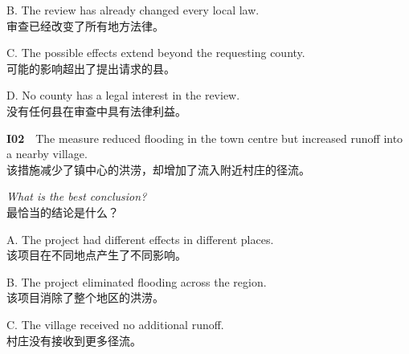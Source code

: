 \documentclass[a4paper,11pt,openany]{report}
\newcommand{\zhline}[1]{{\CJKsf\color{bodygrey}#1}}
\begin{document}
\begin{samepage}
B. The review has already changed every local law.\\
\zhline{审查已经改变了所有地方法律。}
\par\end{samepage}

\begin{samepage}
C. The possible effects extend beyond the requesting county.\\
\zhline{可能的影响超出了提出请求的县。}
\par\end{samepage}

\begin{samepage}
D. No county has a legal interest in the review.\\
\zhline{没有任何县在审查中具有法律利益。}
\par\end{samepage}

\begin{samepage}
\textbf{I02}　The measure reduced flooding in the town centre but increased runoff into a nearby village.\\
\zhline{该措施减少了镇中心的洪涝，却增加了流入附近村庄的径流。}
\par\end{samepage}

\begin{samepage}
\emph{What is the best conclusion?}\\
\zhline{最恰当的结论是什么？}
\par\end{samepage}

\begin{samepage}
A. The project had different effects in different places.\\
\zhline{该项目在不同地点产生了不同影响。}
\par\end{samepage}

\begin{samepage}
B. The project eliminated flooding across the region.\\
\zhline{该项目消除了整个地区的洪涝。}
\par\end{samepage}

\begin{samepage}
C. The village received no additional runoff.\\
\zhline{村庄没有接收到更多径流。}
\par\end{samepage}
\end{document}
